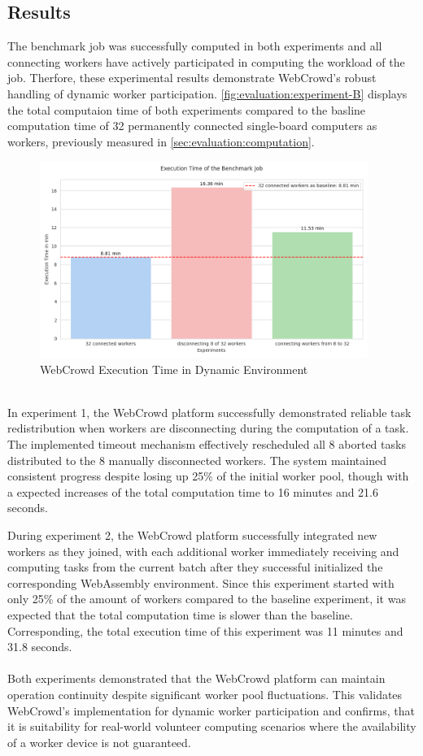 \subsection{Results}
The benchmark job was successfully computed in both experiments and all connecting workers have actively participated in computing the workload of the job. Therfore, these experimental results demonstrate WebCrowd's robust handling of dynamic worker participation. \autoref{fig:evaluation:experiment-B} displays the total computaion time of both experiments compared to the basline computation time of 32 permanently connected single-board computers as workers, previously measured in \autoref{sec:evaluation:computation}.
\begin{figure}[htbp]
    \centering
    \includegraphics[width=0.95\textwidth]{gfx/figures/Evaluation_B.png}
    \caption{WebCrowd Execution Time in Dynamic Environment}
    \label{fig:evaluation:experiment-B}
\end{figure}
~\\
In experiment 1, the WebCrowd platform successfully demonstrated reliable task redistribution when workers are disconnecting during the computation of a task. The implemented timeout mechanism effectively rescheduled all 8 aborted tasks distributed to the 8 manually disconnected workers. The system maintained consistent progress despite losing up 25\% of the initial worker pool, though with a expected increases of the total computation time to 16 minutes and 21.6 seconds.

During experiment 2, the WebCrowd platform successfully integrated new workers as they joined, with each additional worker immediately receiving and computing tasks from the current batch after they successful initialized the corresponding WebAssembly environment. Since this experiment started with only 25\% of the amount of workers compared to the baseline experiment, it was expected that the total computation time is slower than the baseline. Corresponding, the total execution time of this experiment was 11 minutes and 31.8 seconds. 
\\~\\
Both experiments demonstrated that the WebCrowd platform can maintain operation continuity despite significant worker pool fluctuations. This validates WebCrowd's implementation for dynamic worker participation and confirms, that it is suitability for real-world volunteer computing scenarios where the availability of a worker device is not guaranteed.

